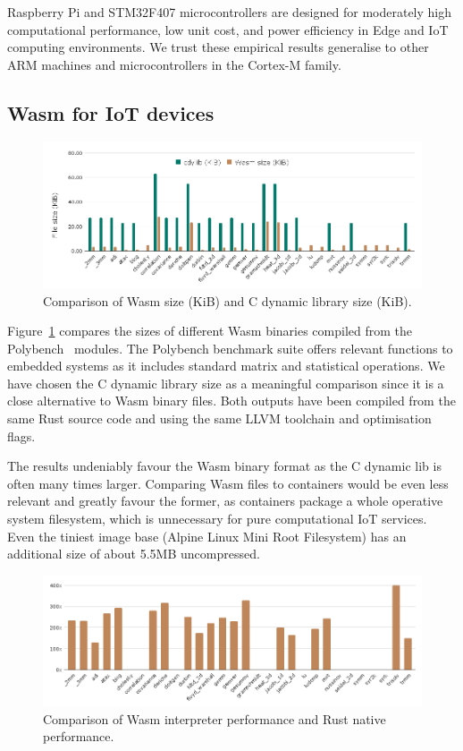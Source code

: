 Raspberry Pi and STM32F407 microcontrollers are designed for moderately high computational performance, low unit cost, and power efficiency in Edge and IoT computing environments. We trust these empirical results generalise to other ARM machines and microcontrollers in the Cortex-M family.

\subsection{Wasm for IoT devices}

\begin{figure}[ht]
\centering
\includegraphics[width=\columnwidth]{figures/b-wasmi-3}
\caption{Comparison of Wasm size (KiB) and C dynamic library size (KiB).} \label{fig:b-wasmi-3}
\end{figure}

Figure~\ref{fig:b-wasmi-3} compares the sizes of different Wasm binaries compiled from the Polybench~\cite{yuki2014understanding} modules. The Polybench benchmark suite offers relevant functions to embedded systems as it includes standard matrix and statistical operations. We have chosen the C dynamic library size as a meaningful comparison since it is a close alternative to Wasm binary files. Both outputs have been compiled from the same Rust source code and using the same LLVM toolchain and optimisation flags.

The results undeniably favour the Wasm binary format as the C dynamic lib is often many times larger. Comparing Wasm files to containers would be even less relevant and greatly favour the former, as containers package a whole operative system filesystem, which is unnecessary for pure computational IoT services. Even the tiniest image base (Alpine Linux Mini Root Filesystem) has an additional size of about 5.5MB uncompressed.

\begin{figure}[ht]
\centering
\includegraphics[width=\columnwidth]{figures/b-wasmi-4}
\caption{Comparison of Wasm interpreter performance and Rust native performance.} \label{fig:b-wasmi-4}
\end{figure}

